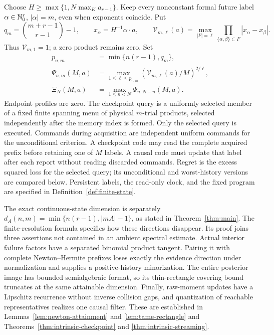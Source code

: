 Choose $H\ge\max\{1,N\max_K a_{r-1}\}$. Keep every nonconstant
formal future label $\alpha\in\mathbb N_0^r$, $|\alpha|=m$, even when
exponents coincide. Put
\[
 q_m=\binom{m+r-1}{r-1}-1,\qquad x_\alpha=H^{-1}\alpha\cdot a,
 \qquad
 \mathcal V_{m,\ell}(a)=\max_{|F|=\ell}
       \prod_{\{\alpha,\beta\}\subset F}|x_\alpha-x_\beta|.
\]
Thus $\mathcal V_{m,1}=1$; a zero product remains zero. Set
\[
 \begin{split}
 p_{n,m}&=\min\{n(r-1),q_m\},\\
 \Psi_{n,m}(M,a)&=\max_{1\le\ell\le p_{n,m}}
       (\mathcal V_{m,\ell}(a)/M)^{2/\ell},\\
 \Xi_N(M,a)&=\max_{1\le n<N}\Psi_{n,N-n}(M,a).
 \end{split}
\]
Endpoint profiles are zero. The checkpoint query is a uniformly selected
member of a fixed finite spanning menu of physical $m$-trial products,
selected independently after the memory index is formed. Only the
selected query is executed. Commands during acquisition are independent
uniform commands for the unconditional criterion. A checkpoint code may read the complete acquired prefix before retaining
one of $M$ labels. A causal code must update that label after each report
without reading discarded commands. Regret is the excess squared loss
for the selected query; its unconditional and worst-history versions
are compared below. Persistent labels, the read-only clock, and the fixed
program are specified in Definition~\ref{def:finite-state}.



The exact continuous-state dimension is separately
$d_A(n,m)=\min\{n(r-1),|mA|-1\}$, as stated in
Theorem~\ref{thm:main}. The finite-resolution formula specifies how
these directions disappear. Its proof joins three assertions not
contained in an ambient spectral estimate. Actual interior failure
factors have a separated binomial product tangent. Pairing it with
complete Newton--Hermite prefixes loses exactly the evidence direction
under normalization and supplies a positive-history minorization.
The entire posterior image has bounded semialgebraic format, so its
thin-rectangle covering bound truncates at the same attainable
dimension. Finally, raw-moment updates have a Lipschitz recurrence
without inverse collision gaps, and quantization of reachable
representatives realizes one causal filter. These are established in
Lemmas~\ref{lem:newton-attainment} and \ref{lem:tame-rectangle} and
Theorems~\ref{thm:intrinsic-checkpoint} and
\ref{thm:intrinsic-streaming}.


